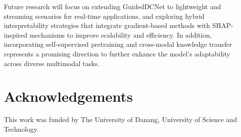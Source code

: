 \documentclass[a4paper,fleqn]{cas-sc}
\begin{document}
Future research will focus on extending GuidedDCNet to lightweight and streaming scenarios for real-time applications, and exploring hybrid interpretability strategies that integrate gradient-based methods with SHAP-inspired mechanisms to improve scalability and efficiency. In addition, incorporating self-supervised pretraining and cross-modal knowledge transfer represents a promising direction to further enhance the model’s adaptability across diverse multimodal tasks.

\section{Acknowledgements} This work was funded by The University of Danang, University of Science and Technology.

\printcredits




\end{document}
